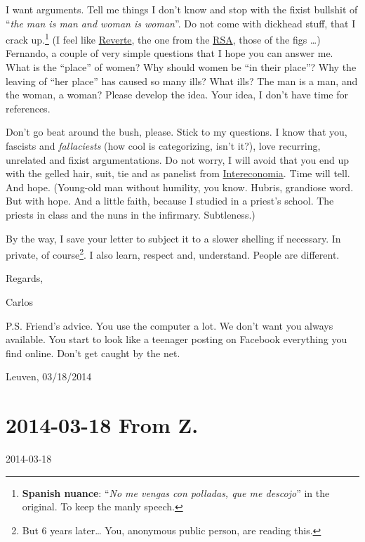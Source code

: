 \documentclass[]{book}
\let\rmarkdownfootnote\footnote%
\def\footnote{\protect\rmarkdownfootnote}
\begin{document}
I want arguments. Tell me things I don't know and stop with the fixist bullshit of ``\emph{the man is man and woman is woman}''. Do not come with dickhead stuff, that I crack up.\footnote{\textbf{Spanish nuance}: ``\emph{No me vengas con polladas, que me descojo}'' in the original. To keep the manly speech.} (I feel like \href{https://en.wikipedia.org/wiki/Arturo_P\%C3\%A9rez-Reverte}{Reverte}, the one from the \href{https://en.wikipedia.org/wiki/Royal_Spanish_Academy}{RSA}, those of the figs \ldots) Fernando, a couple of very simple questions that I hope you can answer me. What is the ``place'' of women? Why should women be ``in their place''? Why the leaving of ``her place'' has caused so many ills? What ills? The man is a man, and the woman, a woman? Please develop the idea. Your idea, I don't have time for references.

Don't go beat around the bush, please. Stick to my questions. I know that you, fascists and \emph{fallaciests} (how cool is categorizing, isn't it?), love recurring, unrelated and fixist argumentations. Do not worry, I will avoid that you end up with the gelled hair, suit, tie and as panelist from \href{https://en.wikipedia.org/wiki/Intereconom\%C3\%ADa_Corporation}{Intereconomia}. Time will tell. And hope. (Young-old man without humility, you know. Hubris, grandiose word. But with hope. And a little faith, because I studied in a priest's school. The priests in class and the nuns in the infirmary. Subtleness.)

By the way, I save your letter to subject it to a slower shelling if necessary. In private, of course\footnote{But 6 years later\ldots{} You, anonymous public person, are reading this.}. I also learn, respect and, understand. People are different.

Regards,

Carlos

P.S. Friend's advice. You use the computer a lot. We don't want you always available. You start to look like a teenager posting on Facebook everything you find online. Don't get caught by the net.

Leuven, 03/18/2014

\hypertarget{fromZ20140318}{%
\section*{2014-03-18 From Z.}\label{fromZ20140318}}

2014-03-18
\end{document}

